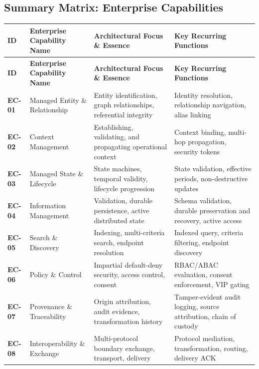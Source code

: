 \subsection*{Summary Matrix: Enterprise Capabilities}
\label{rad:enterprise:258}
\begingroup\small\setlength{\TableWidth}{\dimexpr\linewidth-8\tabcolsep-5\arrayrulewidth\relax}
\begin{longtable}{|>{\raggedright\arraybackslash}p{0.25\TableWidth}|>{\raggedright\arraybackslash}p{0.25\TableWidth}|>{\raggedright\arraybackslash}p{0.25\TableWidth}|>{\raggedright\arraybackslash}p{0.25\TableWidth}|}
\hline\rowcolor{TableHead}\textbf{ID} & \textbf{Enterprise Capability Name} & \textbf{Architectural Focus \& Essence} & \textbf{Key Recurring Functions}\\\hline\endfirsthead
\hline\rowcolor{TableHead}\textbf{ID} & \textbf{Enterprise Capability Name} & \textbf{Architectural Focus \& Essence} & \textbf{Key Recurring Functions}\\\hline\endhead
\hline\endfoot
\textbf{EC-01} & Managed Entity \& Relationship & Entity identification, graph relationships, referential integrity & Identity resolution, relationship navigation, alias linking\\\hline
\textbf{EC-02} & Context Management & Establishing, validating, and propagating operational context & Context binding, multi-hop propagation, security tokens\\\hline
\textbf{EC-03} & Managed State \& Lifecycle & State machines, temporal validity, lifecycle progression & State validation, effective periods, non-destructive updates\\\hline
\textbf{EC-04} & Information Management & Validation, durable persistence, active distributed state & Schema validation, durable preservation and recovery, active access\\\hline
\textbf{EC-05} & Search \& Discovery & Indexing, multi-criteria search, endpoint resolution & Indexed query, criteria filtering, endpoint discovery\\\hline
\textbf{EC-06} & Policy \& Control & Impartial default-deny security, access control, consent & RBAC/\allowbreak{}ABAC evaluation, consent enforcement, VIP gating\\\hline
\textbf{EC-07} & Provenance \& Traceability & Origin attribution, audit evidence, transformation history & Tamper-evident audit logging, source attribution, chain of custody\\\hline
\textbf{EC-08} & Interoperability \& Exchange & Multi-protocol boundary exchange, transport, delivery & Protocol mediation, transformation, routing, delivery ACK\\\hline

\end{longtable}
